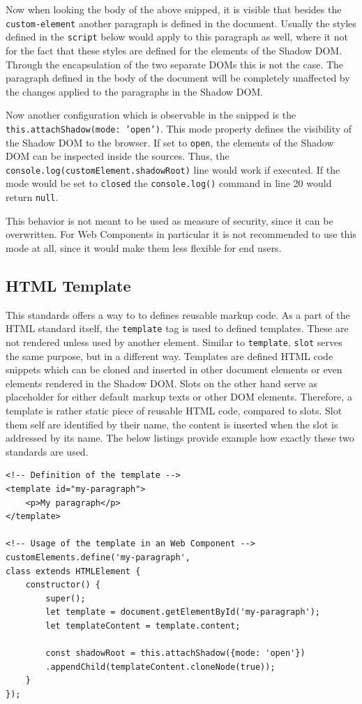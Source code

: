 Now when looking the body of the above snipped, it is visible that besides the \texttt{custom-element} another paragraph is defined in the document. Usually the styles defined in the \texttt{script} below would apply to this paragraph as well, where it not for the fact that these styles are defined for the elements of the Shadow DOM. Through the encapsulation of the two separate DOMs this is not the case. The paragraph defined in the body of the document will be completely unaffected by the changes applied to the paragraphs in the Shadow DOM. \cite{simon_thesis}

Now another configuration which is observable in the snipped is the \texttt{this.attachShadow({mode: 'open'})}. This mode property defines the visibility of the Shadow DOM to the browser. If set to \texttt{open}, the elements of the Shadow DOM can be inspected inside the sources. Thus, the \texttt{console.log(customElement.shadowRoot)} line would work if executed. 
If the mode would be set to \texttt{closed}  the \texttt{console.log()} command in line 20 would return \texttt{null}.\cite{simon_thesis}

This behavior is not meant to be used as measure of security, since it can be overwritten. For Web Components in particular it is not recommended to use this mode at all, since it would make them less flexible for end users.\cite{wc_shadow_dom_google}

\subsection{HTML Template}

This standards offers a way to to defines reusable markup code. As a part of the HTML standard itself, the \texttt{template} tag is used to defined templates. These are not rendered unless used by another element. Similar to \texttt{template}, \texttt{slot} serves the same purpose, but in a different way. Templates are defined HTML code snippets which can be cloned and inserted in other document elements or even elements rendered in the Shadow DOM.
Slots on the other hand serve as placeholder for either default markup texts or other DOM elements. Therefore, a template is rather static piece of reusable HTML code, compared to slots.
Slot them self are identified by their name, the content is inserted when the slot is addressed by its name.
The below listings provide example how exactly these two standards are used. \cite{wc_html_template_slots}

\begin{lstlisting}[caption=Definition and usage of the \texttt{template} standard \cite{wc_html_template_slots}, label=template_example]
<!-- Definition of the template -->
<template id="my-paragraph">
	<p>My paragraph</p>
</template>

<!-- Usage of the template in an Web Component -->
customElements.define('my-paragraph',
class extends HTMLElement {
	constructor() {
		super();
		let template = document.getElementById('my-paragraph');
		let templateContent = template.content;
		
		const shadowRoot = this.attachShadow({mode: 'open'})
		.appendChild(templateContent.cloneNode(true));
	}
});
\end{lstlisting}

